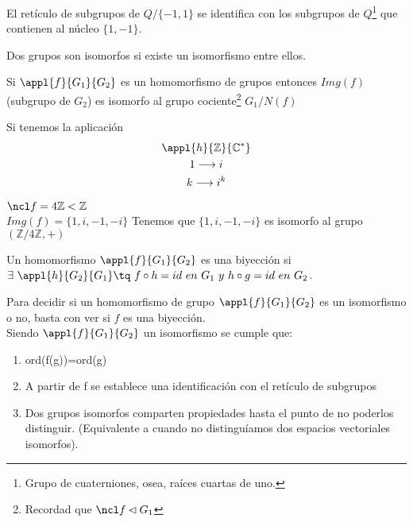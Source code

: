 \documentclass[nochap]{apuntes}
\begin{document}
\begin{example}
El retículo de subgrupos de $Q/{\{ -1, 1 \} }$ se identifica con los subgrupos de $Q$\footnote{Grupo de cuaterniones, osea, raíces cuartas de uno.} que contienen al núcleo $\{ 1, -1\} $.
\end{example}

\begin{defn}
Dos grupos son isomorfos si existe un isomorfismo entre ellos.
\end{defn}

\begin{theorem}\label{thmIsomorfia1}
Si $\appl{f}{G_1}{G_2}$ es un homomorfismo de grupos entonces $Img(f)$ (subgrupo de $G_2$) es isomorfo al grupo cociente\footnote{Recordad que $\ncl f \lhd G_1$} $G_1/{N(f)}$
\end{theorem}

\begin{example}
Si tenemos la aplicación
\begin{gather*}
\appl{h}{\mathbb{Z}}{\mathbb{C}^*}\\
1 \longrightarrow i\\
k\longrightarrow i^{k}\\
\end{gather*}

$\ncl f = 4\mathbb{Z} < \mathbb{Z}$\\
$Img(f) = \{1, i, -1, -i \}$
Tenemos que $\{ 1, i, -1, -i \}$ es isomorfo al grupo $(\mathbb{Z} /4\mathbb{Z}, +)$
\end{example}

\begin{defn}[Biyección]
 Un homomorfismo $\appl{f}{G_1}{G_2}$ es una biyección si \\
 $\exists \ \appl{h}{G_2}{G_1} \tq \ f\circ h =id \ en \ G_1 \ y\ h \circ g = id \ en \ G_2$.
\end{defn}
Para decidir si un homomorfismo de grupo $\appl{f}{G_1}{G_2}$  es un isomorfismo o no, basta con ver si $f$  es una biyección.\\

Siendo $\appl{f}{G_1}{G_2}$ un isomorfismo se cumple que:
\begin{enumerate}
 \item ord(f(g))=ord(g)
 \item A partir de f se establece una identificación con el retículo de subgrupos
 \item Dos grupos isomorfos comparten propiedades hasta el punto de no poderlos distinguir. (Equivalente a cuando no distinguíamos
 dos espacios vectoriales isomorfos).
\end{enumerate}
\end{document}
